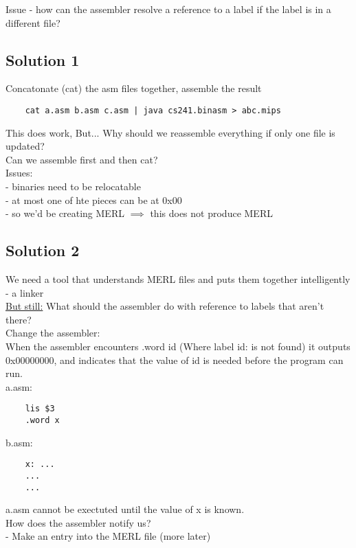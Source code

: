 \documentclass[12pt]{article}
\begin{document}
	Issue - how can the assembler resolve a reference to a label if the label is in a different file?\\
	
	\subsection*{Solution 1}
	Concatonate (cat) the asm files together, assemble the result\\
	\begin{verbatim}
	cat a.asm b.asm c.asm | java cs241.binasm > abc.mips
	\end{verbatim}
	This does work, But... Why should we reassemble everything if only one file is updated?\\
	
	Can we assemble first and then cat?\\
	
	Issues:\\
	- binaries need to be relocatable\\
	- at most one of hte pieces can be at 0x00\\
	- so we'd be creating MERL $\implies$ this does not produce MERL\\
	
	\subsection*{Solution 2}
	We need a tool that understands MERL files and puts them together intelligently - a linker\\
	
	\underline{But still:} What should the assembler do with reference to labels that aren't there?\\

	Change the assembler:\\
	When the assembler encounters .word id (Where label id: is not found) it outputs 0x00000000, and indicates that the value of id is needed before the program can run.\\
	
	a.asm:
	\begin{verbatim}
	lis $3
	.word x
	\end{verbatim}
	b.asm:
	\begin{verbatim}
	x: ...
	...
	...
	\end{verbatim}
	a.asm cannot be exectuted until the value of x is known.\\
	How does the assembler notify us?\\
	- Make an entry into the MERL file (more later)\\
	
\end{document}
